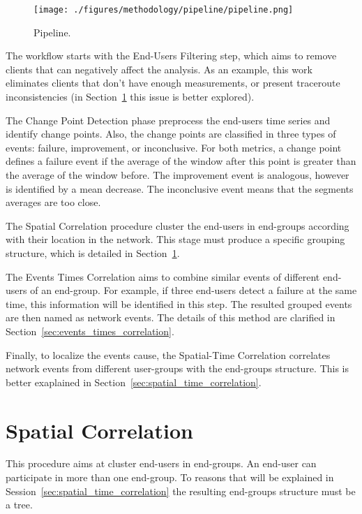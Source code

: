 \begin{figure}[H]
    \centering
    \texttt{[image: ./figures/methodology/pipeline/pipeline.png]}
    \caption{Pipeline.}
\label{fig:pipeline}
\end{figure}%

The workflow starts with the End-Users Filtering step,
which aims to remove clients that can negatively affect the analysis.
As an example, this work eliminates clients
that don't have enough measurements, or present
traceroute inconsistencies (in Section~\ref{sec:spatial_correlation}
this issue is better explored).

The Change Point Detection phase preprocess the end-users time series and
identify change points.
Also, the change points are classified in three types of events: failure,
improvement, or inconclusive. For both metrics, a change point defines a
failure event if the average of the window after this point is greater than the
average of the window before. The improvement event is analogous, however is
identified by a mean decrease.
The inconclusive event means that the segments averages are too close.

The Spatial Correlation procedure cluster the end-users in end-groups
according with their location in the network.
This stage must produce a specific grouping structure, which is detailed in
Section~\ref{sec:spatial_correlation}.

The Events Times Correlation aims to combine similar events of different
end-users of an end-group. For example, if three end-users detect a failure at
the same time, this information will be identified in this step. The resulted
grouped events are then named as network events.
The details of this method are clarified in
Section~\ref{sec:events_times_correlation}.

Finally, to localize the events cause, the Spatial-Time Correlation
correlates network events
from different user-groups with the end-groups structure.
This is better exaplained in Section~\ref{sec:spatial_time_correlation}.

\section{Spatial Correlation}
\label{sec:spatial_correlation}

This procedure aims at cluster end-users in end-groups. An end-user can
participate in more than one end-group. To reasons that will be explained in
Session~\ref{sec:spatial_time_correlation} the resulting end-groups structure
must be a tree.

